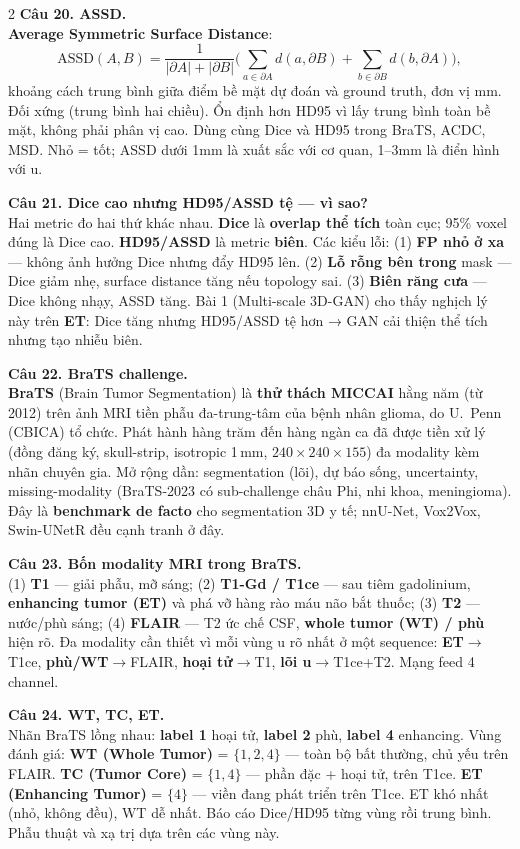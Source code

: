 \begin{paracol}{2}
\textbf{Câu 20. ASSD.}\\
\textbf{Average Symmetric Surface Distance}:
\[\text{ASSD}(A,B)=\frac{1}{|\partial A|+|\partial B|}\Big(\sum_{a\in\partial A}d(a,\partial B)+\sum_{b\in\partial B}d(b,\partial A)\Big),\]
khoảng cách trung bình giữa điểm bề mặt dự đoán và ground truth, đơn vị mm. Đối xứng (trung bình hai chiều). Ổn định hơn HD95 vì lấy trung bình toàn bề mặt, không phải phân vị cao. Dùng cùng Dice và HD95 trong BraTS, ACDC, MSD. Nhỏ = tốt; ASSD dưới 1mm là xuất sắc với cơ quan, 1--3mm là điển hình với u.

\textbf{Câu 21. Dice cao nhưng HD95/ASSD tệ — vì sao?}\\
Hai metric đo hai thứ khác nhau. \textbf{Dice} là \textbf{overlap thể tích} toàn cục; 95\% voxel đúng là Dice cao. \textbf{HD95/ASSD} là metric \textbf{biên}. Các kiểu lỗi: (1) \textbf{FP nhỏ ở xa} — không ảnh hưởng Dice nhưng đẩy HD95 lên. (2) \textbf{Lỗ rỗng bên trong} mask — Dice giảm nhẹ, surface distance tăng nếu topology sai. (3) \textbf{Biên răng cưa} — Dice không nhạy, ASSD tăng. Bài 1 (Multi-scale 3D-GAN) cho thấy nghịch lý này trên \textbf{ET}: Dice tăng nhưng HD95/ASSD tệ hơn → GAN cải thiện thể tích nhưng tạo nhiễu biên.

\textbf{Câu 22. BraTS challenge.}\\
\textbf{BraTS} (Brain Tumor Segmentation) là \textbf{thử thách MICCAI} hằng năm (từ 2012) trên ảnh MRI tiền phẫu đa-trung-tâm của bệnh nhân glioma, do U.~Penn (CBICA) tổ chức. Phát hành hàng trăm đến hàng ngàn ca đã được tiền xử lý (đồng đăng ký, skull-strip, isotropic 1\,mm, $240\!\times\!240\!\times\!155$) đa modality kèm nhãn chuyên gia. Mở rộng dần: segmentation (lõi), dự báo sống, uncertainty, missing-modality (BraTS-2023 có sub-challenge châu Phi, nhi khoa, meningioma). Đây là \textbf{benchmark de facto} cho segmentation 3D y tế; nnU-Net, Vox2Vox, Swin-UNetR đều cạnh tranh ở đây.

\textbf{Câu 23. Bốn modality MRI trong BraTS.}\\
(1) \textbf{T1} — giải phẫu, mỡ sáng; (2) \textbf{T1-Gd / T1ce} — sau tiêm gadolinium, \textbf{enhancing tumor (ET)} và phá vỡ hàng rào máu não bắt thuốc; (3) \textbf{T2} — nước/phù sáng; (4) \textbf{FLAIR} — T2 ức chế CSF, \textbf{whole tumor (WT) / phù} hiện rõ. Đa modality cần thiết vì mỗi vùng u rõ nhất ở một sequence: \textbf{ET}$\to$T1ce, \textbf{phù/WT}$\to$FLAIR, \textbf{hoại tử}$\to$T1, \textbf{lõi u}$\to$T1ce+T2. Mạng feed 4 channel.

\textbf{Câu 24. WT, TC, ET.}\\
Nhãn BraTS lồng nhau: \textbf{label 1} hoại tử, \textbf{label 2} phù, \textbf{label 4} enhancing. Vùng đánh giá: \textbf{WT (Whole Tumor)} = $\{1,2,4\}$ — toàn bộ bất thường, chủ yếu trên FLAIR. \textbf{TC (Tumor Core)} = $\{1,4\}$ — phần đặc + hoại tử, trên T1ce. \textbf{ET (Enhancing Tumor)} = $\{4\}$ — viền đang phát triển trên T1ce. ET khó nhất (nhỏ, không đều), WT dễ nhất. Báo cáo Dice/HD95 từng vùng rồi trung bình. Phẫu thuật và xạ trị dựa trên các vùng này.


\end{paracol}
